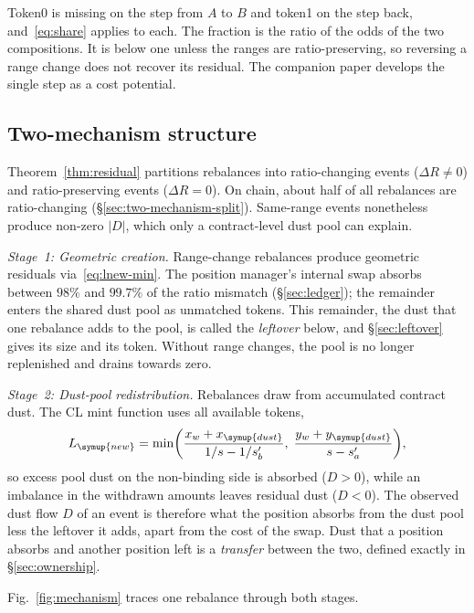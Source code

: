 \documentclass[11pt,a4paper]{article}
\DeclareRobustCommand{\acr}[1]{{\addfontfeatures{Letters=UppercaseSmallCaps,LetterSpace=2}#1}}
\theoremstyle{siphon}
\begin{document}
\noindent Token0 is missing on the step from $A$ to $B$ and token1 on the step back, and~\eqref{eq:share} applies to each. The fraction is the ratio of the odds of the two compositions. It is below one unless the ranges are ratio-preserving, so reversing a range change does not recover its residual. The companion paper develops the single step as a cost potential.\cite{ryan2026localtime}

\subsection{Two-mechanism structure}\label{sec:two-mechanism}

Theorem~\ref{thm:residual} partitions rebalances into ratio-changing events ($\Delta R \neq 0$) and ratio-preserving events ($\Delta R = 0$). On chain, about half of all rebalances are ratio-changing (\S\ref{sec:two-mechanism-split}). Same-range events nonetheless produce non-zero $|D|$, which only a contract-level dust pool can explain.

\textit{Stage~1: Geometric creation.} Range-change rebalances produce geometric residuals via~\eqref{eq:lnew-min}. The position manager's internal swap absorbs between $98\%$ and $99.7\%$ of the ratio mismatch (\S\ref{sec:ledger}); the remainder enters the shared dust pool as unmatched tokens. This remainder, the dust that one rebalance adds to the pool, is called the \emph{leftover} below, and \S\ref{sec:leftover} gives its size and its token. Without range changes, the pool is no longer replenished and drains towards zero.

\textit{Stage~2: Dust-pool redistribution.} Rebalances draw from accumulated contract dust. The \acr{CL} mint function uses all available tokens,
\begin{equation}\label{eq:mint}
L_{\symup{new}} = \min\biggl(\frac{x_w + x_{\symup{dust}}}{1/s - 1/s_b'}, \; \frac{y_w + y_{\symup{dust}}}{s - s_a'}\biggr),
\end{equation}
so excess pool dust on the non-binding side is absorbed ($D > 0$), while an imbalance in the withdrawn amounts leaves residual dust ($D < 0$). The observed dust flow $D$ of an event is therefore what the position absorbs from the dust pool less the leftover it adds, apart from the cost of the swap. Dust that a position absorbs and another position left is a \emph{transfer} between the two, defined exactly in \S\ref{sec:ownership}.

Fig.~\ref{fig:mechanism} traces one rebalance through both stages.
\end{document}
